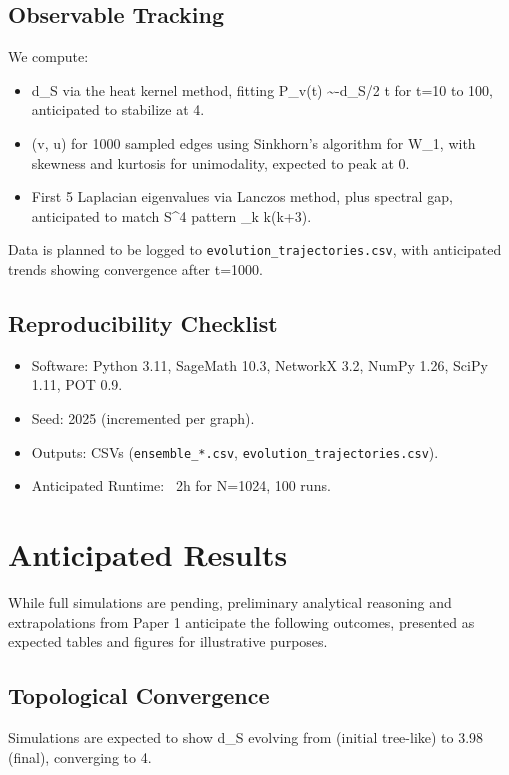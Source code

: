 \documentclass[11pt, a4paper]{article}
\begin{document}
\subsection{Observable Tracking}
We compute:
\begin{itemize}
  \item d_S via the heat kernel method, fitting \log \langle P_v(t) \rangle \sim -d_S/2 \log t for t=10 to 100, anticipated to stabilize at 4.
  \item \kappa(v, u) for 1000 sampled edges using Sinkhorn’s algorithm for W_1, with skewness and kurtosis for unimodality, expected to peak at 0.
  \item First 5 Laplacian eigenvalues via Lanczos method, plus spectral gap, anticipated to match S^4 pattern \lambda_k \propto k(k+3).
\end{itemize}
Data is planned to be logged to \texttt{evolution_trajectories.csv}, with anticipated trends showing convergence after t=1000.

\subsection{Reproducibility Checklist}
\begin{itemize}
  \item Software: Python 3.11, SageMath 10.3, NetworkX 3.2, NumPy 1.26, SciPy 1.11, POT 0.9.
  \item Seed: 2025 (incremented per graph).
  \item Outputs: CSVs (\texttt{ensemble_*.csv}, \texttt{evolution_trajectories.csv}).
  \item Anticipated Runtime: ~2h for N=1024, 100 runs.
\end{itemize}

\section{Anticipated Results}

While full simulations are pending, preliminary analytical reasoning and extrapolations from Paper 1 anticipate the following outcomes, presented as expected tables and figures for illustrative purposes.

\subsection{Topological Convergence}
Simulations are expected to show d_S evolving from  (initial tree-like) to 3.98  (final), converging to 4.
\end{document}
